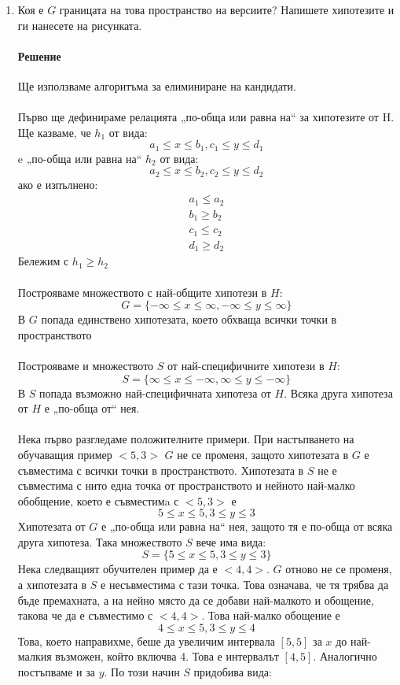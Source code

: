 \documentclass{article}
\begin{document}
\begin{enumerate}
\item 
Коя е $G$ границата на това пространство на версиите? Напишете хипотезите и ги нанесете на рисунката.
\paragraph{Решение}
Ще използваме алгоритъма за елиминиране на кандидати.\\\\
Първо ще дефинираме релацията „по-обща или равна на“ за хипотезите от H. Ще казваме, че $h_1$ от вида:
\[a_1 \leq x \leq b_1, c_1 \leq y \leq d_1\] 
e „по-обща или равна на“ $h_2$ от вида:
\[a_2 \leq x \leq b_2, c_2 \leq y \leq d_2\] 
ако е изпълнено:
\[
	\begin{array}{lr}
		a_1 \leq a_2\\
		b_1 \geq b_2\\
		c_1 \leq c_2\\
		d_1 \geq d_2
	\end{array}
\]
Бележим с $h_1 \geq h_2$\\\\
Построяваме множеството с най-общите хипотези в $H$:
\[G = \{-\infty \leq x \leq \infty, -\infty \leq y \leq \infty\}\]
В $G$ попада единствено хипотезата, което обхваща всички точки в пространството \\\\
Построяваме и множеството $S$ от най-специфичните хипотези в $H$:
\[S = \{\infty \leq x \leq -\infty, \infty \leq y \leq -\infty\}\]
В $S$ попада възможно най-специфичната хипотеза от $H$. Всяка друга хипотеза от $H$ е „по-обща от“ нея.\\\\
Нека първо разгледаме положителните примери. При настъпването на обучаващия пример $<5, 3>$ $G$ не се променя, защото хипотезата в $G$ е съвместима с всички точки в пространството. Хипотезата в $S$ не е съвместима с нито една точка от пространството и нейното най-малко обобщение, което е съвместимa с $<5, 3>$ е 
\[5 \leq x \leq 5, 3 \leq y \leq 3\]
Хипотезата от $G$ е „по-обща или равна на“ нея, защото тя е по-обща от всяка друга хипотеза.
Така множеството $S$ вече има вида:
\[S = \{5 \leq x \leq 5, 3 \leq y \leq 3\}\]
Нека следващият обучителен пример да е $<4, 4>$. $G$ отново не се променя, а хипотезата в $S$ е несъвместима с тази точка. Това означава, че тя трябва да бъде премахната, а на нейно място да се добави най-малкото и обощение, такова че да е съвместимо с $<4, 4>$. Това най-малко обощение е 
\[4 \leq x \leq 5, 3 \leq y \leq 4\]
Това, което направихме, беше да увеличим интервала $[5, 5]$ за $x$ до най-малкия възможен, който включва 4. Това е интервалът $[4, 5]$. Аналогично постъпваме и за $y$. По този начин $S$ придобива вида:

\end{enumerate}
\end{document}

